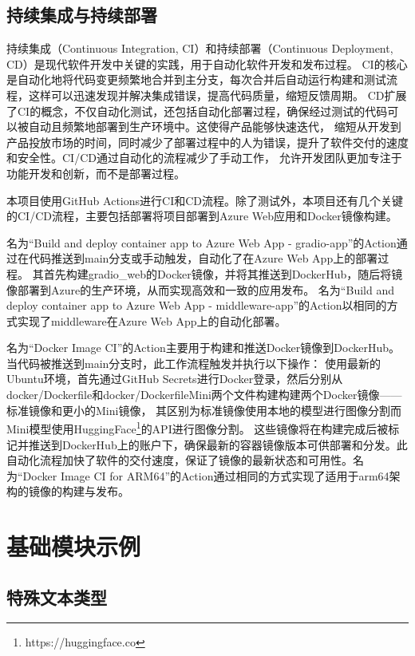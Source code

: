\documentclass[a4paper,AutoFakeBold,oneside,12pt]{book}
\begin{document}
\section{持续集成与持续部署}
持续集成（Continuous Integration, CI）和持续部署（Continuous Deployment, CD）是现代软件开发中关键的实践，用于自动化软件开发和发布过程。
CI的核心是自动化地将代码变更频繁地合并到主分支，每次合并后自动运行构建和测试流程，这样可以迅速发现并解决集成错误，提高代码质量，缩短反馈周期。
CD扩展了CI的概念，不仅自动化测试，还包括自动化部署过程，确保经过测试的代码可以被自动且频繁地部署到生产环境中。这使得产品能够快速迭代，
缩短从开发到产品投放市场的时间，同时减少了部署过程中的人为错误，提升了软件交付的速度和安全性。CI/CD通过自动化的流程减少了手动工作，
允许开发团队更加专注于功能开发和创新，而不是部署过程。

本项目使用GitHub Actions进行CI和CD流程。除了测试外，本项目还有几个关键的CI/CD流程，主要包括部署将项目部署到Azure Web应用和Docker镜像构建。

名为“Build and deploy container app to Azure Web App - gradio-app”的Action通过在代码推送到main分支或手动触发，自动化了在Azure Web App上的部署过程。
其首先构建gradio\_web的Docker镜像，并将其推送到DockerHub，随后将镜像部署到Azure的生产环境，从而实现高效和一致的应用发布。
名为“Build and deploy container app to Azure Web App - middleware-app”的Action以相同的方式实现了middleware在Azure Web App上的自动化部署。

名为“Docker Image CI”的Action主要用于构建和推送Docker镜像到DockerHub。当代码被推送到main分支时，此工作流程触发并执行以下操作：
使用最新的Ubuntu环境，首先通过GitHub Secrets进行Docker登录，然后分别从docker/Dockerfile和docker/DockerfileMini两个文件构建构建两个Docker镜像——标准镜像和更小的Mini镜像，
其区别为标准镜像使用本地的模型进行图像分割而Mini模型使用HuggingFace\footnote{https://huggingface.co}的API进行图像分割。
这些镜像将在构建完成后被标记并推送到DockerHub上的账户下，确保最新的容器镜像版本可供部署和分发。此自动化流程加快了软件的交付速度，保证了镜像的最新状态和可用性。名为“Docker Image CI for ARM64”的Action通过相同的方式实现了适用于arm64架构的镜像的构建与发布。






\chapter{基础模块示例}

\section{特殊文本类型}
\end{document}
